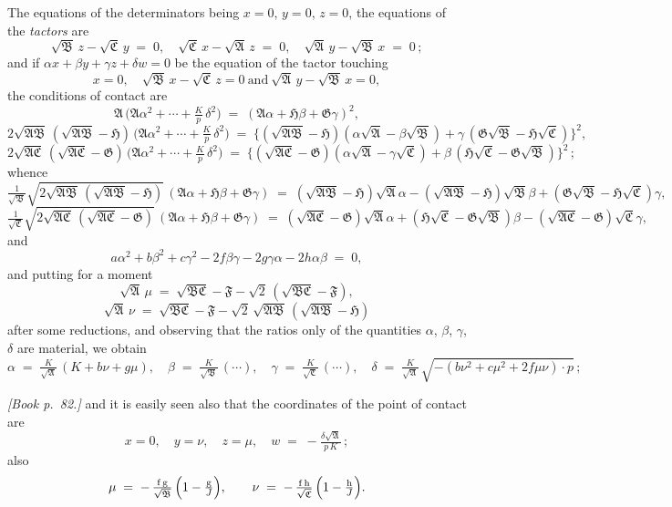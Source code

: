 \documentclass[11pt]{article}
\providecommand{\fA}{\mathfrak{A}}
\providecommand{\fB}{\mathfrak{B}}
\providecommand{\fC}{\mathfrak{C}}
\providecommand{\fF}{\mathfrak{F}}
\providecommand{\fG}{\mathfrak{G}}
\providecommand{\fH}{\mathfrak{H}}
\begin{document}
The equations of the determinators being $x = 0$, $y = 0$, $z = 0$, the equations of the \emph{tactors} are
\[
\sqrt{\fB}\,z - \sqrt{\fC}\,y \;=\; 0,\quad \sqrt{\fC}\,x - \sqrt{\fA}\,z \;=\; 0,\quad \sqrt{\fA}\,y - \sqrt{\fB}\,x \;=\; 0\,;
\]
and if $\alpha x + \beta y + \gamma z + \delta w = 0$ be the equation of the tactor touching
\[
x = 0,\quad \sqrt{\fB}\,x - \sqrt{\fC}\,z = 0\ \text{and}\ \sqrt{\fA}\,y - \sqrt{\fB}\,x = 0,
\]
the conditions of contact are
\[
\fA\,\bigl(\fA\alpha^{2} + \cdots + \tfrac{K}{p}\,\delta^{2}\bigr) \;=\; (\fA\alpha + \fH\beta + \fG\gamma)^{2},
\]
\[
2\sqrt{\fA\fB}\,(\sqrt{\fA\fB} - \fH)\,\bigl(\fA\alpha^{2} + \cdots + \tfrac{K}{p}\,\delta^{2}\bigr) \;=\; \bigl\{(\sqrt{\fA\fB} - \fH)(\alpha\sqrt{\fA} - \beta\sqrt{\fB}) + \gamma\,(\fG\sqrt{\fB} - \fH\sqrt{\fC})\bigr\}^{2},
\]
\[
2\sqrt{\fA\fC}\,(\sqrt{\fA\fC} - \fG)\,\bigl(\fA\alpha^{2} + \cdots + \tfrac{K}{p}\,\delta^{2}\bigr) \;=\; \bigl\{(\sqrt{\fA\fC} - \fG)(\alpha\sqrt{\fA} - \gamma\sqrt{\fC}) + \beta\,(\fH\sqrt{\fC} - \fG\sqrt{\fB})\bigr\}^{2}\,;
\]
whence
\[
\tfrac{1}{\sqrt{\fB}}\sqrt{2\sqrt{\fA\fB}\,(\sqrt{\fA\fB} - \fH)}\,(\fA\alpha + \fH\beta + \fG\gamma) \;=\; (\sqrt{\fA\fB} - \fH)\sqrt{\fA}\alpha - (\sqrt{\fA\fB} - \fH)\sqrt{\fB}\beta + (\fG\sqrt{\fB} - \fH\sqrt{\fC})\gamma,
\]
\[
\tfrac{1}{\sqrt{\fC}}\sqrt{2\sqrt{\fA\fC}\,(\sqrt{\fA\fC} - \fG)}\,(\fA\alpha + \fH\beta + \fG\gamma) \;=\; (\sqrt{\fA\fC} - \fG)\sqrt{\fA}\alpha + (\fH\sqrt{\fC} - \fG\sqrt{\fB})\beta - (\sqrt{\fA\fC} - \fG)\sqrt{\fC}\gamma,
\]
and
\[
a\alpha^{2} + b\beta^{2} + c\gamma^{2} - 2f\beta\gamma - 2g\gamma\alpha - 2h\alpha\beta \;=\; 0,
\]
and putting for a moment
\[
\sqrt{\fA}\,\mu \;=\; \sqrt{\fB\fC} - \fF - \sqrt{2}\,(\sqrt{\fB\fC} - \fF),
\]
\[
\sqrt{\fA}\,\nu \;=\; \sqrt{\fB\fC} - \fF - \sqrt{2}\,\sqrt{\fA\fB}\,(\sqrt{\fA\fB} - \fH)
\]
after some reductions, and observing that the ratios only of the quantities $\alpha$, $\beta$, $\gamma$, $\delta$ are material, we obtain
\[
\alpha \;=\; \tfrac{K}{\sqrt{\fA}}\,(K + b\nu + g\mu),\quad \beta \;=\; \tfrac{K}{\sqrt{\fB}}\,(\cdots),\quad \gamma \;=\; \tfrac{K}{\sqrt{\fC}}\,(\cdots),\quad \delta \;=\; \tfrac{K}{\sqrt{\fA}}\,\sqrt{-(b\nu^{2} + c\mu^{2} + 2f\mu\nu)\cdot p}\,;
\]

\bigskip

\noindent\emph{[Book p.~82.]} and it is easily seen also that the coordinates of the point of contact are
\[
x = 0,\quad y = \nu,\quad z = \mu,\quad w \;=\; -\tfrac{\delta\sqrt{\fA}}{p\,K}\,;
\]
also
\[
\mu \;=\; -\,\tfrac{\mathrm{f}\,\mathrm{g}}{\sqrt{\fB}}\,\Bigl(1 - \tfrac{\mathrm{g}}{J}\Bigr),\qquad \nu \;=\; -\,\tfrac{\mathrm{f}\,\mathrm{h}}{\sqrt{\fC}}\,\Bigl(1 - \tfrac{\mathrm{h}}{J}\Bigr).
\]
\end{document}
